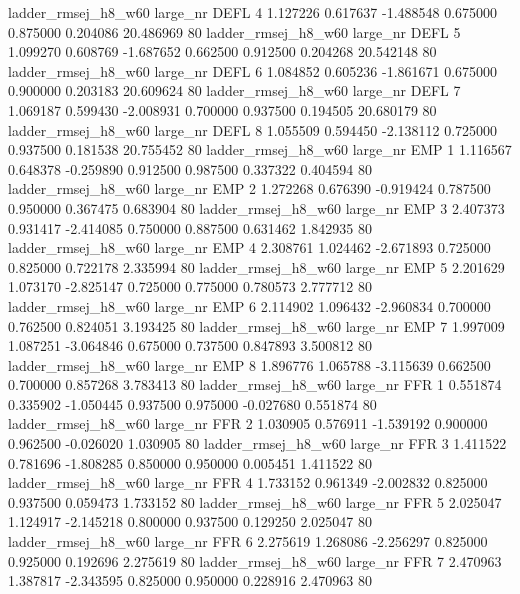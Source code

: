 ladder_rmsej_h8_w60   large_nr     DEFL                 4  1.127226  0.617637  -1.488548 0.675000 0.875000  0.204086   20.486969 80
ladder_rmsej_h8_w60   large_nr     DEFL                 5  1.099270  0.608769  -1.687652 0.662500 0.912500  0.204268   20.542148 80
ladder_rmsej_h8_w60   large_nr     DEFL                 6  1.084852  0.605236  -1.861671 0.675000 0.900000  0.203183   20.609624 80
ladder_rmsej_h8_w60   large_nr     DEFL                 7  1.069187  0.599430  -2.008931 0.700000 0.937500  0.194505   20.680179 80
ladder_rmsej_h8_w60   large_nr     DEFL                 8  1.055509  0.594450  -2.138112 0.725000 0.937500  0.181538   20.755452 80
ladder_rmsej_h8_w60   large_nr      EMP                 1  1.116567  0.648378  -0.259890 0.912500 0.987500  0.337322    0.404594 80
ladder_rmsej_h8_w60   large_nr      EMP                 2  1.272268  0.676390  -0.919424 0.787500 0.950000  0.367475    0.683904 80
ladder_rmsej_h8_w60   large_nr      EMP                 3  2.407373  0.931417  -2.414085 0.750000 0.887500  0.631462    1.842935 80
ladder_rmsej_h8_w60   large_nr      EMP                 4  2.308761  1.024462  -2.671893 0.725000 0.825000  0.722178    2.335994 80
ladder_rmsej_h8_w60   large_nr      EMP                 5  2.201629  1.073170  -2.825147 0.725000 0.775000  0.780573    2.777712 80
ladder_rmsej_h8_w60   large_nr      EMP                 6  2.114902  1.096432  -2.960834 0.700000 0.762500  0.824051    3.193425 80
ladder_rmsej_h8_w60   large_nr      EMP                 7  1.997009  1.087251  -3.064846 0.675000 0.737500  0.847893    3.500812 80
ladder_rmsej_h8_w60   large_nr      EMP                 8  1.896776  1.065788  -3.115639 0.662500 0.700000  0.857268    3.783413 80
ladder_rmsej_h8_w60   large_nr      FFR                 1  0.551874  0.335902  -1.050445 0.937500 0.975000 -0.027680    0.551874 80
ladder_rmsej_h8_w60   large_nr      FFR                 2  1.030905  0.576911  -1.539192 0.900000 0.962500 -0.026020    1.030905 80
ladder_rmsej_h8_w60   large_nr      FFR                 3  1.411522  0.781696  -1.808285 0.850000 0.950000  0.005451    1.411522 80
ladder_rmsej_h8_w60   large_nr      FFR                 4  1.733152  0.961349  -2.002832 0.825000 0.937500  0.059473    1.733152 80
ladder_rmsej_h8_w60   large_nr      FFR                 5  2.025047  1.124917  -2.145218 0.800000 0.937500  0.129250    2.025047 80
ladder_rmsej_h8_w60   large_nr      FFR                 6  2.275619  1.268086  -2.256297 0.825000 0.925000  0.192696    2.275619 80
ladder_rmsej_h8_w60   large_nr      FFR                 7  2.470963  1.387817  -2.343595 0.825000 0.950000  0.228916    2.470963 80
